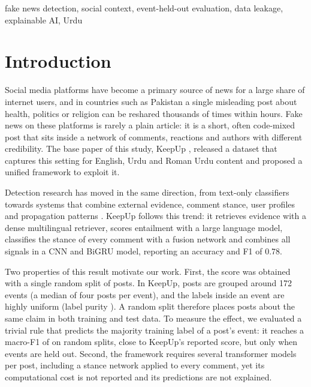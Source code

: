 \documentclass[conference]{IEEEtran}
\begin{document}
\begin{IEEEkeywords}
fake news detection, social context, event-held-out evaluation, data leakage, explainable AI, Urdu
\end{IEEEkeywords}

\section{Introduction}
Social media platforms have become a primary source of news for a large share of internet users, and in
countries such as Pakistan a single misleading post about health, politics or religion can be reshared
thousands of times within hours. Fake news on these platforms is rarely a plain article: it is a short,
often code-mixed post that sits inside a network of comments, reactions and authors with different
credibility. The base paper of this study, KeepUp \cite{wasim2026keepup}, released a dataset that captures
this setting for English, Urdu and Roman Urdu content and proposed a unified framework to exploit it.

Detection research has moved in the same direction, from text-only classifiers towards systems that combine
external evidence, comment stance, user profiles and propagation patterns
\cite{wasim2026keepup,almutair2025msdsi,nivedita2026hgcm}. KeepUp follows this trend: it retrieves evidence
with a dense multilingual retriever, scores entailment with a large language model, classifies the stance of
every comment with a fusion network and combines all signals in a CNN and BiGRU model, reporting an accuracy
and F1 of 0.78.

Two properties of this result motivate our work. First, the score was obtained with a single random split
of posts. In KeepUp, posts are grouped around 172 events (a median of four posts per event), and the labels
inside an event are highly uniform (label purity \EventPurity). A random split therefore places posts about
the same claim in both training and test data. To measure the effect, we evaluated a trivial rule that
predicts the majority training label of a post's event: it reaches a macro-F1 of \LookupRandomFone{} on random
splits, close to KeepUp's reported score, but only \LookupEventFone{} when events are held out. Second, the
framework requires several transformer models per post, including a stance network applied to every comment,
yet its computational cost is not reported and its predictions are not explained.
\end{document}
